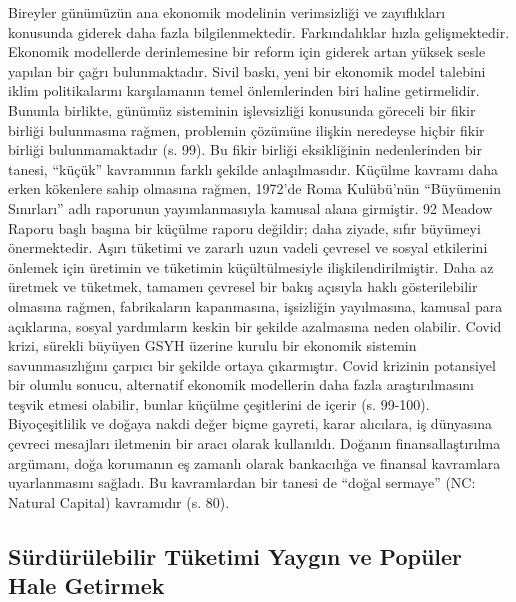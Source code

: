 \documentclass[
]{book}
\begin{document}
Bireyler günümüzün ana ekonomik modelinin verimsizliği ve zayıflıkları konusunda giderek daha fazla bilgilenmektedir. Farkındalıklar hızla gelişmektedir. Ekonomik modellerde derinlemesine bir reform için giderek artan yüksek sesle yapılan bir çağrı bulunmaktadır. Sivil baskı, yeni bir ekonomik model talebini iklim politikalarını karşılamanın temel önlemlerinden biri haline getirmelidir. Bununla birlikte, günümüz sisteminin işlevsizliği konusunda göreceli bir fikir birliği bulunmasına rağmen, problemin çözümüne ilişkin neredeyse hiçbir fikir birliği bulunmamaktadır (s. 99).\citep{ponthieu2019climate} Bu fikir birliği eksikliğinin nedenlerinden bir tanesi, ``küçük'' kavramının farklı şekilde anlaşılmasıdır. Küçülme kavramı daha erken kökenlere sahip olmasına rağmen, 1972'de Roma Kulübü'nün ``Büyümenin Sınırları'' adlı raporunun yayımlanmasıyla kamusal alana girmiştir. 92 Meadow Raporu başlı başına bir küçülme raporu değildir; daha ziyade, sıfır büyümeyi önermektedir. Aşırı tüketimi ve zararlı uzun vadeli çevresel ve sosyal etkilerini önlemek için üretimin ve tüketimin küçültülmesiyle ilişkilendirilmiştir. Daha az üretmek ve tüketmek, tamamen çevresel bir bakış açısıyla haklı gösterilebilir olmasına rağmen, fabrikaların kapanmasına, işsizliğin yayılmasına, kamusal para açıklarına, sosyal yardımların keskin bir şekilde azalmasına neden olabilir. Covid krizi, sürekli büyüyen GSYH üzerine kurulu bir ekonomik sistemin savunmasızlığını çarpıcı bir şekilde ortaya çıkarmıştır. Covid krizinin potansiyel bir olumlu sonucu, alternatif ekonomik modellerin daha fazla araştırılmasını teşvik etmesi olabilir, bunlar küçülme çeşitlerini de içerir (s. 99-100). \citep{ponthieu2019climate} Biyoçeşitlilik ve doğaya nakdi değer biçme gayreti, karar alıcılara, iş dünyasına çevreci mesajları iletmenin bir aracı olarak kullanıldı. Doğanın finansallaştırılma argümanı, doğa korumanın eş zamanlı olarak bankacılığa ve finansal kavramlara uyarlanmasını sağladı. Bu kavramlardan bir tanesi de ``doğal sermaye'' (NC: Natural Capital) kavramıdır (s. 80). \citep{empson2020iklimi}

\hypertarget{suxfcrduxfcruxfclebilir-tuxfcketimi-yaygux131n-ve-popuxfcler-hale-getirmek}{%
\subsection{Sürdürülebilir Tüketimi Yaygın ve Popüler Hale Getirmek}\label{suxfcrduxfcruxfclebilir-tuxfcketimi-yaygux131n-ve-popuxfcler-hale-getirmek}}
\end{document}
